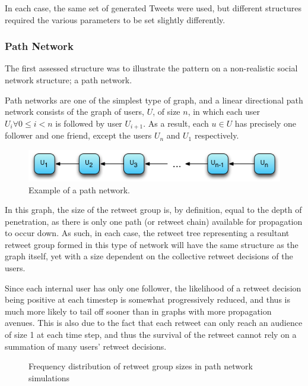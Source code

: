 In each case, the same set of generated Tweets were used, but different structures required the various parameters to be set slightly differently.


\subsubsection{Path Network}
The first assessed structure was to illustrate the pattern on a non-realistic social network structure; a path network.

Path networks are one of the simplest type of graph, and a linear directional path network consists of the graph of users, $U$, of size $n$, in which each user $U_i \forall 0 \leq i < n$ is followed by user $U_{i+1}$. As a result, each $u \in U$ has precisely one follower and one friend, except the users $U_n$ and $U_1$ respectively.

\begin{figure}[h]
\centering
\includegraphics[scale=0.8]{4.Chapter2/Media/path_network.png} 
\caption{Example of a path network.}
\label{fig:path_network}
\end{figure}

In this graph, the size of the retweet group is, by definition, equal to the depth of penetration, as there is only one path (or retweet chain) available for propagation to occur down. As such, in each case, the retweet tree representing a resultant retweet group formed in this type of network will have the same structure as the graph itself, yet with a size dependent on the collective retweet decisions of the users.

Since each internal user has only one follower, the likelihood of a retweet decision being positive at each timestep is somewhat progressively reduced, and thus is much more likely to tail off sooner than in graphs with more propagation avenues. This is also due to the fact that each retweet can only reach an audience of size 1 at each time step, and thus the survival of the retweet cannot rely on a summation of many users' retweet decisions. 

\begin{figure}[h]
\centering
{}
\caption{Frequency distribution of retweet group sizes in path network simulations}
\label{fig:linear}
\end{figure}

